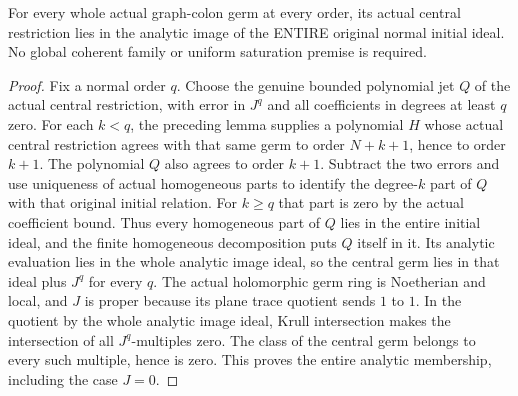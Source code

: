 \begin{lemma}
\label{hir:real-domain-entire-graph-colon-central-reverse-inclusion}
\leanok
For every whole actual graph-colon germ at every order, its actual central
restriction lies in the analytic image of the ENTIRE original normal initial
ideal. No global coherent family or uniform saturation premise is required.
\end{lemma}
\begin{proof}
Fix a normal order $q$. Choose the genuine bounded polynomial jet $Q$ of the
actual central restriction, with error in $J^q$ and all coefficients in
degrees at least $q$ zero. For each $k<q$, the preceding lemma supplies a
polynomial $H$ whose actual central restriction agrees with that same germ
to order $N+k+1$, hence to order $k+1$. The polynomial $Q$ also agrees to
order $k+1$. Subtract the two errors and use uniqueness of actual homogeneous
parts to identify the degree-$k$ part of $Q$ with that original initial
relation. For $k\geq q$ that part is zero by the actual coefficient bound.
Thus every homogeneous part of $Q$ lies in the entire initial ideal, and
the finite homogeneous decomposition puts $Q$ itself in it. Its analytic
evaluation lies in the whole analytic image ideal, so the central germ lies
in that ideal plus $J^q$ for every $q$. The actual holomorphic germ ring is
Noetherian and local, and $J$ is proper because its plane trace quotient
sends $1$ to $1$. In the quotient by the whole analytic image ideal, Krull
intersection makes the intersection of all $J^q$-multiples zero. The class
of the central germ belongs to every such multiple, hence is zero. This
proves the entire analytic membership, including the case $J=0$.
\end{proof}

